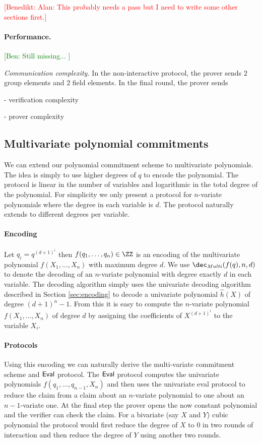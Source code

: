 \documentclass{article}
\theoremstyle{definition}
\newcommand{\benedikt}[1]{{\textcolor{red}{[Benedikt: #1]}}}
\newcommand{\ben}[1]{{\textcolor{green}{[Ben: #1]}}}
\newcommand{\benedikt}[1]{}
\newcommand{\ben}[1]{}
\begin{document}
\benedikt{\@ Alan: This probably needs a pass but I need to write some other sections first.}


\paragraph{Performance.} 
\ben{Still missing... } 

\textit{Communication complexity.} In the non-interactive protocol, the prover sends $2$ group elements and $2$ field elements. In the final round, the prover sends 
 
 - verification complexity 
 
 - prover complexity


\subsection{Multivariate polynomial commitments}\label{sec:multivariate}

We can extend our polynomial commitment scheme to multivariate polynomials. The idea is simply to use higher degrees of $q$ to encode the polynomial. The protocol is linear in the number of variables and logarithmic in the total degree of the polynomial. For simplicity we only present a protocol for $n$-variate polynomials where the degree in each variable is $d$. The protocol naturally extends to different degrees per variable.
\paragraph{Encoding}
Let $q_i=q^{(d+1)^i}$ then $f(q_1,\dots,q_n)\in \ZZ$ is an encoding of the multivariate polynomial $f(X_1,\dots,X_n)$ with maximum degree $d$. We use $\dec_{Multi}(f(q),n,d)$ to denote the decoding of an $n$-variate polynomial with degree exactly $d$ in each variable. The decoding algorithm simply uses the univariate decoding algorithm described in Section \ref{sec:encoding} to decode a univariate polynomial $\hat{h}(X)$ of degree $(d+1)^n-1$. From this it is easy to compute the $n$-variate polynomial $f(X_1,\dots,X_n)$ of degree $d$ by assigning the coefficients of $X^{(d+1)^i}$ to the variable $X_i$.
\paragraph{Protocols}
 Using this encoding we can naturally derive the multi-variate commitment scheme and $\textsf{{Eval}}$ protocol. The $\textsf{{Eval}}$ protocol computes the univariate polynomials $f(q_1,\dots,q_{n-1},X_n)$ and then uses the univariate eval protocol to reduce the claim from a claim about an $n$-variate polynomial to one about an $n-1$-variate one. At the final step the prover opens the now constant polynomial and the verifier can check the claim. For a bivariate (say $X$ and $Y$) cubic polynomial the protocol would first reduce the degree of $X$ to $0$ in two rounds of interaction and then reduce the degree of $Y$ using another two rounds.
 
\end{document}
